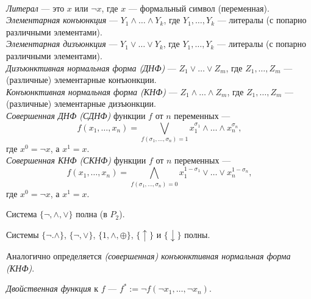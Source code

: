 \documentclass[12pt,a4paper]{article}
\begin{document}
    \begin{definition}\ \\
        \emph{Литерал} --- это $x$ или $\neg x$, где $x$ --- формальный символ (переменная).\\
        \emph{Элементарная конъюнкция} --- $Y_1 \wedge \dots \wedge Y_k$, где $Y_1, \dots, Y_k$ --- литералы (с попарно различными элементами).\\
        \emph{Элементарная дизъюнкция} --- $Y_1 \vee \dots \vee Y_k$, где $Y_1, \dots, Y_k$ --- литералы (с попарно различными элементами).\\
        \emph{Дизъюнктивная нормальная форма (ДНФ)} --- $Z_1 \vee \dots \vee Z_m$, где $Z_1, \dots, Z_m$ --- (различные) элементарные конъюнкции.\\
        \emph{Конъюнктивная нормальная форма (КНФ)} --- $Z_1 \wedge \dots \wedge Z_m$, где $Z_1, \dots, Z_m$ --- (различные) элементарные дизъюнкции.\\
        \emph{Совершенная ДНФ (СДНФ)} функции $f$ от $n$ переменных --- \[f(x_1, \dots, x_n)=\bigvee_{f(\sigma_1, \dots, \sigma_n)=1} x_1^{\sigma_1} \wedge \dots \wedge x_n^{\sigma_n},\]
        где $x^0 = \neg x$, а $x^1 = x$.\\
        \emph{Совершенная КНФ (СКНФ)} функции $f$ от $n$ переменных --- \[f(x_1, \dots, x_n)=\bigwedge_{f(\sigma_1, \dots, \sigma_n)=0} x_1^{1-\sigma_1} \vee \dots \vee x_n^{1-\sigma_n},\]
        где $x^0 = \neg x$, а $x^1 = x$.
    \end{definition}

    \begin{statement}
        Система $\{\neg, \wedge, \vee\}$ полна (в $P_2$).
    \end{statement}

    \begin{corollary}
        Системы $\{\neg. \wedge\}$, $\{\neg, \vee\}$, $\{1, \wedge, \oplus\}$, $\{\uparrow\}$ и $\{\downarrow\}$ полны.
    \end{corollary}

    \begin{definition}
        Аналогично определяется \emph{(совершенная) конъюнктивная нормальная форма (КНФ)}.
    \end{definition}

    \begin{definition}
        \emph{Двойственная функция} к $f$ --- $f^* := \neg f(\neg x_1, \dots, \neg x_n)$.
    \end{definition}
\end{document}
